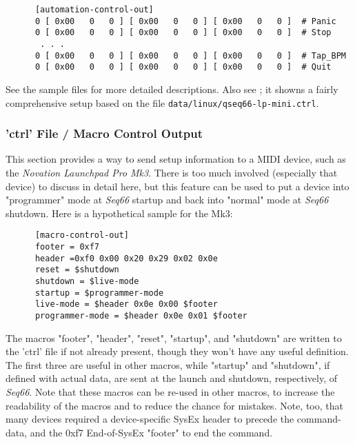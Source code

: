    \begin{verbatim}
      [automation-control-out]
      0 [ 0x00   0   0 ] [ 0x00   0   0 ] [ 0x00   0   0 ]  # Panic
      0 [ 0x00   0   0 ] [ 0x00   0   0 ] [ 0x00   0   0 ]  # Stop
       . . .
      0 [ 0x00   0   0 ] [ 0x00   0   0 ] [ 0x00   0   0 ]  # Tap_BPM
      0 [ 0x00   0   0 ] [ 0x00   0   0 ] [ 0x00   0   0 ]  # Quit
   \end{verbatim}

   See the sample files for more detailed descriptions.
   Also see ; it showns a fairly comprehensive
   setup based on the file \texttt{data/linux/qseq66-lp-mini.ctrl}.

\subsubsection{'ctrl' File / Macro Control Output}
\label{subsubsec:configuration_ctrl_macro_control_out}

   This section provides a way to send setup information to a MIDI device,
   such as the \textsl{Novation Launchpad Pro Mk3}.
   There is too much involved (especially that device) to discuss in
   detail here, but this feature can be used to put a device into
   "programmer" mode at \textsl{Seq66} startup and back into
   "normal" mode at \textsl{Seq66} shutdown.
   Here is a hypothetical sample for the Mk3:

   \begin{verbatim}
      [macro-control-out]
      footer = 0xf7
      header =0xf0 0x00 0x20 0x29 0x02 0x0e 
      reset = $shutdown
      shutdown = $live-mode
      startup = $programmer-mode
      live-mode = $header 0x0e 0x00 $footer
      programmer-mode = $header 0x0e 0x01 $footer
   \end{verbatim}

   The macros "footer", "header", "reset", "startup", and "shutdown"
   are written to the 'ctrl' file if not already present, though
   they won't have any useful definition.
   The first three are useful in other macros, while "startup" and
   "shutdown", if defined with actual data, are sent at the launch
   and shutdown, respectively, of \textsl{Seq66}.
   Note that these macros can be re-used in other macros, to
   increase the readability of the macros and to reduce the
   chance for mistakes.
   Note, too, that many devices required a device-specific
   SysEx header to precede the command-data, and the 0xf7
   End-of-SysEx "footer" to end the command.

